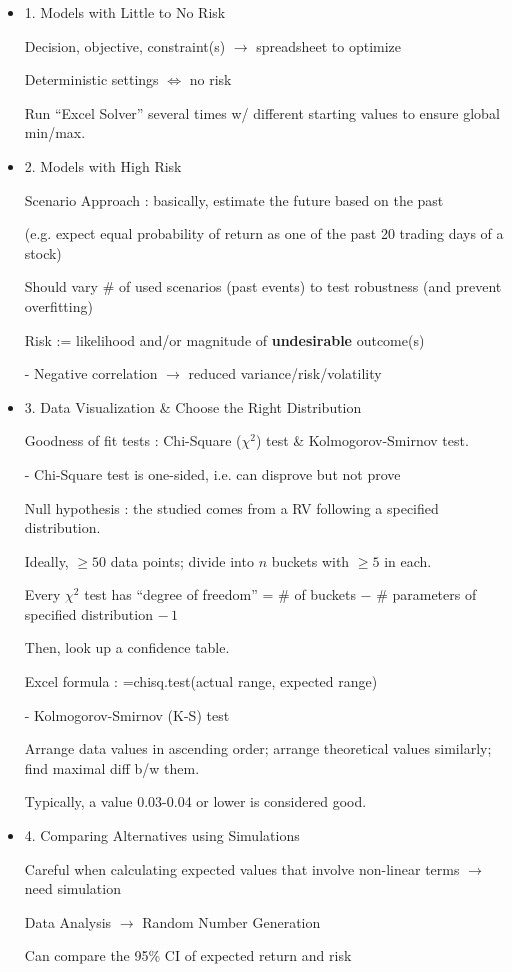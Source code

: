 \documentclass{article}
\begin{document}
\newpage
{}
\begin{itemize}
	\item 1. Models with Little to No Risk

	Decision, objective, constraint(s) $\rightarrow$ spreadsheet to optimize

	Deterministic settings $\iff$ no risk

	Run ``Excel Solver'' several times w/ different starting values to ensure global min/max.


	\item 2. Models with High Risk

	{\color{red} Scenario Approach} : basically, estimate the future based on the past

	(e.g. expect equal probability of return as one of the past 20 trading days of a stock)

	Should vary \# of used scenarios (past events) to test robustness (and prevent overfitting)

	Risk := likelihood and/or magnitude of \textbf{undesirable} outcome(s)

	- Negative correlation $\rightarrow$ reduced variance/risk/volatility


	\item 3. Data Visualization \& Choose the Right Distribution

	Goodness of fit tests : Chi-Square ($\chi^2$) test \& Kolmogorov-Smirnov test.

	- Chi-Square test is one-sided, i.e. can disprove but not prove

	Null hypothesis : the studied comes from a RV following a specified distribution.

	Ideally, $\geq 50$ data points; divide into $n$ buckets with $\geq 5$ in each.

	Every $\chi^2$ test has ``degree of freedom'' = \# of buckets $-$ \# parameters of specified distribution $-\, 1$

	Then, look up a confidence table.

	Excel formula : =chisq.test(actual range, expected range)

	- Kolmogorov-Smirnov (K-S) test

	Arrange data values in ascending order; arrange theoretical values similarly; find maximal diff b/w them.

	Typically, a value 0.03-0.04 or lower is considered good.


	\item 4. Comparing Alternatives using Simulations

	Careful when calculating expected values that involve non-linear terms $\rightarrow$ need simulation

	Data Analysis $\rightarrow$ Random Number Generation

	Can compare the 95\% CI of expected return and risk
\end{itemize}
\end{document}
